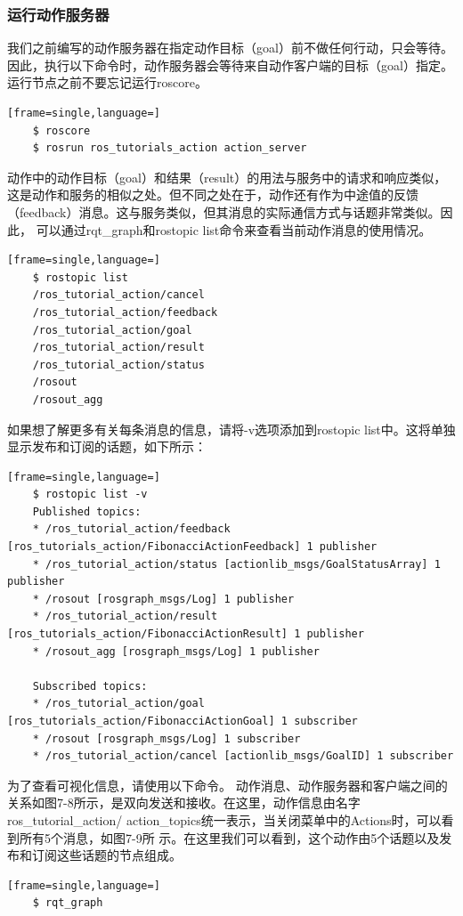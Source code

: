 \documentclass[geye,green,kindle,cn]{elegantnote}
\begin{document}
\subsubsection{运行动作服务器}
我们之前编写的动作服务器在指定动作目标（goal）前不做任何行动，只会等待。因此，执行以下命令时，动作服务器会等待来自动作客户端的目标（goal）指定。运行节点之前不要忘记运行roscore。
\begin{lstlisting}[frame=single,language=]
    $ roscore 
    $ rosrun ros_tutorials_action action_server 
\end{lstlisting}
动作中的动作目标（goal）和结果（result）的用法与服务中的请求和响应类似，这是动作和服务的相似之处。但不同之处在于，动作还有作为中途值的反馈 （feedback）消息。这与服务类似，但其消息的实际通信方式与话题非常类似。因此， 可以通过rqt_graph和rostopic list命令来查看当前动作消息的使用情况。 
\begin{lstlisting}[frame=single,language=]
    $ rostopic list 
    /ros_tutorial_action/cancel 
    /ros_tutorial_action/feedback 
    /ros_tutorial_action/goal 
    /ros_tutorial_action/result 
    /ros_tutorial_action/status 
    /rosout 
    /rosout_agg
\end{lstlisting}

如果想了解更多有关每条消息的信息，请将-v选项添加到rostopic list中。这将单独 显示发布和订阅的话题，如下所示： 
\begin{lstlisting}[frame=single,language=]
    $ rostopic list -v 
    Published topics: 
    * /ros_tutorial_action/feedback [ros_tutorials_action/FibonacciActionFeedback] 1 publisher 
    * /ros_tutorial_action/status [actionlib_msgs/GoalStatusArray] 1 publisher 
    * /rosout [rosgraph_msgs/Log] 1 publisher 
    * /ros_tutorial_action/result [ros_tutorials_action/FibonacciActionResult] 1 publisher 
    * /rosout_agg [rosgraph_msgs/Log] 1 publisher 
    
    Subscribed topics: 
    * /ros_tutorial_action/goal [ros_tutorials_action/FibonacciActionGoal] 1 subscriber 
    * /rosout [rosgraph_msgs/Log] 1 subscriber 
    * /ros_tutorial_action/cancel [actionlib_msgs/GoalID] 1 subscriber
\end{lstlisting}

为了查看可视化信息，请使用以下命令。 动作消息、动作服务器和客户端之间的 关系如图7-8所示，是双向发送和接收。在这里，动作信息由名字ros_tutorial_action/ action_topics统一表示，当关闭菜单中的Actions时，可以看到所有5个消息，如图7-9所 示。在这里我们可以看到，这个动作由5个话题以及发布和订阅这些话题的节点组成。 
\begin{lstlisting}[frame=single,language=]
    $ rqt_graph
\end{lstlisting}
\end{document}
